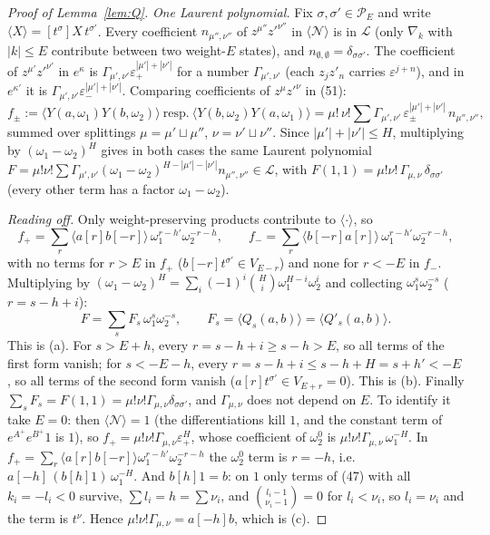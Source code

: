 \documentclass[11pt]{amsart}
\theoremstyle{remark}
\newcommand{\cP}{\mathcal{P}}
\newcommand{\cL}{\mathcal{L}}
\newcommand{\ip}[1]{\langle #1\rangle}
\begin{document}
\begin{proof}[Proof of Lemma~\ref{lem:Q}]
\emph{One Laurent polynomial.} Fix $\sigma,\sigma'\in\cP_E$ and write $\ip X=[t^\sigma]X\,t^{\sigma'}$. Every coefficient
$n_{\mu'',\nu''}$ of $z^{\mu''}z'^{\nu''}$ in $\ip{\mathcal N}$ is in $\cL$ (only $\nabla_k$ with $|k|\le E$ contribute between
two weight-$E$ states), and $n_{\emptyset,\emptyset}=\delta_{\sigma\sigma'}$. The coefficient of $z^{\mu'}z'^{\nu'}$ in $e^\kappa$
is $\Gamma_{\mu',\nu'}\varepsilon_+^{|\mu'|+|\nu'|}$ for a number $\Gamma_{\mu',\nu'}$ (each $z_jz'_n$ carries $\varepsilon^{j+n}$), and in
$e^{\kappa'}$ it is $\Gamma_{\mu',\nu'}\varepsilon_-^{|\mu'|+|\nu'|}$. Comparing coefficients of $z^\mu z'^\nu$ in (51):
\[
f_\pm:=\ip{Y(a,\omega_1)Y(b,\omega_2)}\ \text{resp.}\ \ip{Y(b,\omega_2)Y(a,\omega_1)}
=\mu!\,\nu!\sum\Gamma_{\mu',\nu'}\,\varepsilon_\pm^{|\mu'|+|\nu'|}\,n_{\mu'',\nu''},
\]
summed over splittings $\mu=\mu'\sqcup\mu''$, $\nu=\nu'\sqcup\nu''$. Since $|\mu'|+|\nu'|\le H$, multiplying by
$(\omega_1-\omega_2)^H$ gives in both cases the same Laurent polynomial
$F=\mu!\nu!\sum\Gamma_{\mu',\nu'}(\omega_1-\omega_2)^{H-|\mu'|-|\nu'|}n_{\mu'',\nu''}\in\cL$, with
$F(1,1)=\mu!\nu!\,\Gamma_{\mu,\nu}\,\delta_{\sigma\sigma'}$ (every other term has a factor $\omega_1-\omega_2$).

\emph{Reading off.} Only weight-preserving products contribute to $\ip\cdot$, so
\[f_+=\sum_r\ip{a[r]b[-r]}\,\omega_1^{r-h'}\omega_2^{-r-h},\qquad f_-=\sum_r\ip{b[-r]a[r]}\,\omega_1^{r-h'}\omega_2^{-r-h},\]
with no terms for $r>E$ in $f_+$ ($b[-r]t^{\sigma'}\in V_{E-r}$) and none for $r<-E$ in $f_-$. Multiplying by
$(\omega_1-\omega_2)^H=\sum_i(-1)^i\binom Hi\omega_1^{H-i}\omega_2^i$ and collecting
$\omega_1^s\omega_2^{-s}$ ($r=s-h+i$):
\[F=\sum_sF_s\,\omega_1^s\omega_2^{-s},\qquad F_s=\ip{Q_s(a,b)}=\ip{Q'_s(a,b)}.\]
This is (a). For $s>E+h$, every $r=s-h+i\ge s-h>E$, so all terms of the first form vanish; for $s<-E-h$, every
$r=s-h+i\le s-h+H=s+h'<-E$, so all terms of the second form vanish ($a[r]t^{\sigma'}\in V_{E+r}=0$). This is (b).
Finally $\sum_sF_s=F(1,1)=\mu!\nu!\Gamma_{\mu,\nu}\delta_{\sigma\sigma'}$, and $\Gamma_{\mu,\nu}$ does not depend on $E$.
To identify it take $E=0$: then $\ip{\mathcal N}=1$ (the differentiations kill $1$, and the constant term of
$e^{A^+}e^{B^+}1$ is $1$), so $f_+=\mu!\nu!\Gamma_{\mu,\nu}\varepsilon_+^H$, whose coefficient of $\omega_2^0$ is
$\mu!\nu!\Gamma_{\mu,\nu}\,\omega_1^{-H}$. In $f_+=\sum_r\ip{a[r]b[-r]}\omega_1^{r-h'}\omega_2^{-r-h}$ the $\omega_2^0$ term is
$r=-h$, i.e.\ $a[-h]\,(b[h]1)\,\omega_1^{-H}$. And $b[h]1=b$: on $1$ only terms of (47) with all $k_i=-l_i<0$ survive,
$\sum l_i=h=\sum\nu_i$, and $\binom{l_i-1}{\nu_i-1}=0$ for $l_i<\nu_i$, so $l_i=\nu_i$ and the term is $t^\nu$. Hence
$\mu!\nu!\Gamma_{\mu,\nu}=a[-h]b$, which is (c).
\end{proof}
\end{document}

